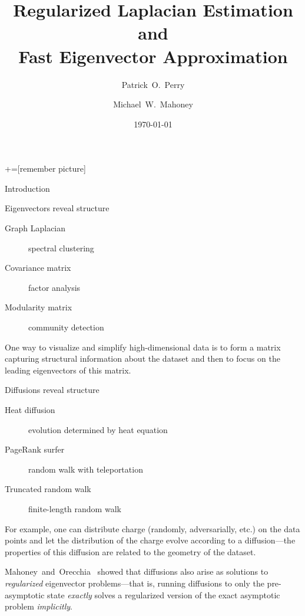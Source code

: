 \documentclass[xcolor=dvipsnames]{beamer}
\title{Regularized Laplacian Estimation and \\ Fast Eigenvector Approximation}
\author{Patrick~O.~Perry \and Michael~W.~Mahoney}
\institute[NYU Stern and Stanford] {
  NYU Stern \and Stanford University
}
\date{\today}
\begin{document}
+=[remember picture]

\everymath{\displaystyle}

\begin{frame}
  \titlepage
\end{frame}


\begin{frame}[c]
  \begin{block}{}
  \begin{center}
    \huge{Introduction}
  \end{center}
  \end{block}
\end{frame}


\begin{frame}
  \begin{block}{Eigenvectors reveal structure}
  \begin{description}
    \item[Graph Laplacian] spectral clustering
    \item[Covariance matrix] factor analysis
    \item[Modularity matrix] community detection
  \end{description}
  \end{block}
  
  One way to visualize and simplify high-dimensional data is to form a matrix
  capturing structural information about the dataset and then to focus on
  the leading eigenvectors of this matrix.
\end{frame}


\begin{frame}
  \begin{block}{Diffusions reveal structure}
  \begin{description}
    \item[Heat diffusion] evolution determined by heat equation
    \item[PageRank surfer] random walk with teleportation
    \item[Truncated random walk] finite-length random walk
  \end{description}
  \end{block}

  For example, one can distribute charge (randomly, adversarially, etc.) on 
  the data points and let the distribution of the charge evolve according to 
  a diffusion---the properties of this diffusion are related to the geometry 
  of the dataset.

  Mahoney~and~Orecchia~\cite{MO11-implementing} showed that diffusions also 
  arise as solutions to \emph{regularized} eigenvector problems---that is, 
  running diffusions to only the pre-asymptotic state \emph{exactly} solves 
  a regularized version of the exact asymptotic problem \emph{implicitly}.
\end{frame}
\end{document}

